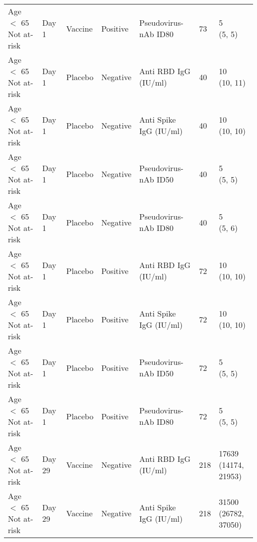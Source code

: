 \documentclass[]{book}
\theoremstyle{definition}
\theoremstyle{definition}
\theoremstyle{definition}
\newcommand{\1}{\mathbbm{1}}
\begin{document}
\begin{landscape}
\begin{ThreePartTable}
\begin{longtable}[t]{>{\raggedright\arraybackslash}p{7cm}llllll}
\hspace{1em}Age $<$ 65 Not at-risk & Day 1 & Vaccine & Positive & Pseudovirus-nAb ID80 & 73 & \makecell[l]{5\\(5, 5)}\\
\hspace{1em}Age $<$ 65 Not at-risk & Day 1 & Placebo & Negative & Anti RBD IgG (IU/ml) & 40 & \makecell[l]{10\\(10, 11)}\\
\hspace{1em}Age $<$ 65 Not at-risk & Day 1 & Placebo & Negative & Anti Spike IgG (IU/ml) & 40 & \makecell[l]{10\\(10, 10)}\\
\hspace{1em}Age $<$ 65 Not at-risk & Day 1 & Placebo & Negative & Pseudovirus-nAb ID50 & 40 & \makecell[l]{5\\(5, 5)}\\
\hspace{1em}Age $<$ 65 Not at-risk & Day 1 & Placebo & Negative & Pseudovirus-nAb ID80 & 40 & \makecell[l]{5\\(5, 6)}\\
\hspace{1em}Age $<$ 65 Not at-risk & Day 1 & Placebo & Positive & Anti RBD IgG (IU/ml) & 72 & \makecell[l]{10\\(10, 10)}\\
\hspace{1em}Age $<$ 65 Not at-risk & Day 1 & Placebo & Positive & Anti Spike IgG (IU/ml) & 72 & \makecell[l]{10\\(10, 10)}\\
\hspace{1em}Age $<$ 65 Not at-risk & Day 1 & Placebo & Positive & Pseudovirus-nAb ID50 & 72 & \makecell[l]{5\\(5, 5)}\\
\hspace{1em}Age $<$ 65 Not at-risk & Day 1 & Placebo & Positive & Pseudovirus-nAb ID80 & 72 & \makecell[l]{5\\(5, 5)}\\
\hspace{1em}Age $<$ 65 Not at-risk & Day 29 & Vaccine & Negative & Anti RBD IgG (IU/ml) & 218 & \makecell[l]{17639\\(14174, 21953)}\\
\hspace{1em}Age $<$ 65 Not at-risk & Day 29 & Vaccine & Negative & Anti Spike IgG (IU/ml) & 218 & \makecell[l]{31500\\(26782, 37050)}\\

\end{longtable}
\end{ThreePartTable}
\end{landscape}
\end{document}
